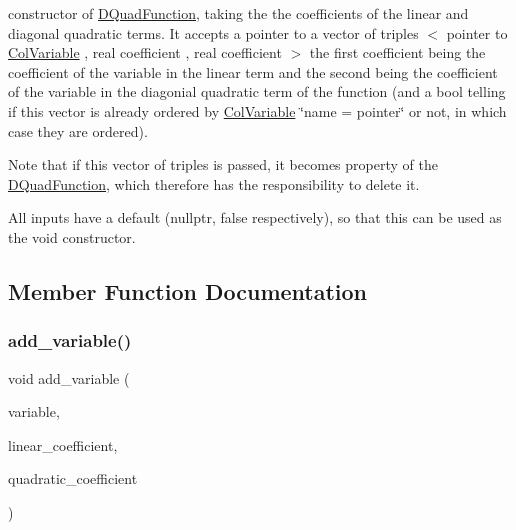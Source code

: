 constructor of \mbox{\hyperlink{class_s_m_spp__di__unipi__it_1_1_d_quad_function}{D\+Quad\+Function}}, taking the the coefficients of the linear and diagonal quadratic terms. It accepts a pointer to a vector of triples $<$ pointer to \mbox{\hyperlink{class_s_m_spp__di__unipi__it_1_1_col_variable}{Col\+Variable}} , real coefficient , real coefficient $>$ the first coefficient being the coefficient of the variable in the linear term and the second being the coefficient of the variable in the diagonial quadratic term of the function (and a bool telling if this vector is already ordered by \mbox{\hyperlink{class_s_m_spp__di__unipi__it_1_1_col_variable}{Col\+Variable}} \char`\"{}name = pointer\char`\"{} or not, in which case they are ordered).

Note that if this vector of triples is passed, it becomes property of the \mbox{\hyperlink{class_s_m_spp__di__unipi__it_1_1_d_quad_function}{D\+Quad\+Function}}, which therefore has the responsibility to delete it.

All inputs have a default (nullptr, false respectively), so that this can be used as the void constructor. 

\subsection{Member Function Documentation}
\mbox{\label{class_s_m_spp__di__unipi__it_1_1_d_quad_function_ac33c70ad7cab1b92406bea65783e4891}} 
\subsubsection{\texorpdfstring{add\+\_\+variable()}{add\_variable()}}
{\footnotesize\ttfamily void add\+\_\+variable (\begin{DoxyParamCaption}\item[{\mbox{\hyperlink{class_s_m_spp__di__unipi__it_1_1_col_variable}{Col\+Variable}} $\ast$const}]{variable,  }\item[{const \mbox{\hyperlink{class_s_m_spp__di__unipi__it_1_1_d_quad_function_a1fa0f848dbb8d52dc62a1adfee1a1f90}{Coefficient}}}]{linear\+\_\+coefficient,  }\item[{const \mbox{\hyperlink{class_s_m_spp__di__unipi__it_1_1_d_quad_function_a1fa0f848dbb8d52dc62a1adfee1a1f90}{Coefficient}}}]{quadratic\+\_\+coefficient }\end{DoxyParamCaption})}

